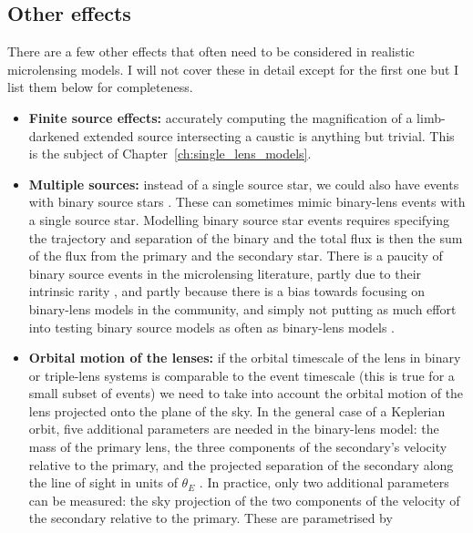 \documentclass[12pt,dvipsnames]{report}
\begin{document}
\subsection{Other effects}
There are a few other effects that often need to be considered in realistic 
microlensing models. I will not cover these in detail except for the
first one but I list them below for completeness.
\begin{itemize}
    \item \textbf{Finite source effects:} accurately computing the magnification
          of a limb-darkened extended source intersecting a caustic is anything but 
          trivial. This is the subject of Chapter~\ref{ch:single_lens_models}.
    \item \textbf{Multiple sources:} instead of a single source star, we could also have
          events with binary source stars \citep{1998A&A...333..893D}.  
          These can sometimes mimic binary-lens events with a single source star.
          Modelling binary source star events requires specifying the trajectory and separation of
          the binary and the total flux is then the sum of the flux from the primary and the
          secondary star.
          There is a paucity of binary source events in the microlensing literature, partly due to
          their intrinsic rarity \citep{1998MNRAS.301..231H}, and partly because there is a
          bias towards focusing on binary-lens models in the community, and
          simply not putting as much effort into testing binary source models as
          often as binary-lens models \citep{2017AJ....153..129J,2019MNRAS.484.5608D}.
    \item \textbf{Orbital motion of the lenses:} if the orbital timescale of
          the lens in binary or triple-lens systems is comparable to the event timescale
          (this is true for a small subset of events) we need to take into account
          the orbital motion of the lens projected onto the plane of the sky.
          In the general case of a Keplerian orbit, five additional parameters are needed
          in the binary-lens model: the mass of the primary lens, the three components of the
          secondary's velocity relative to the primary, and the projected separation
          of the secondary along the line of sight in units of $\theta_E$
          \citep{1998A&A...329..361D}. In practice, only two additional parameters
          can be measured: the sky projection of the two components of the velocity of
          the secondary relative to the primary. These are parametrised by

\end{itemize}
\end{document}
